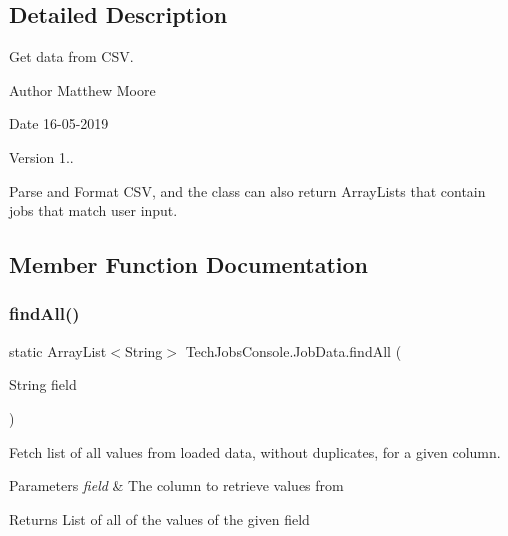 \subsection{Detailed Description}
Get data from C\+SV. 

\begin{DoxyAuthor}{Author}
Matthew Moore 
\end{DoxyAuthor}
\begin{DoxyDate}{Date}
16-\/05-\/2019 
\end{DoxyDate}
\begin{DoxyVersion}{Version}
1..
\end{DoxyVersion}
Parse and Format C\+SV, and the class can also return Array\+Lists that contain jobs that match user input. 

\subsection{Member Function Documentation}
\mbox{\label{class_tech_jobs_console_1_1_job_data_ac601200d9c2e103a30eee0b0eef6961a}} 
\subsubsection{\texorpdfstring{findAll()}{findAll()}\hspace{0.1cm}{\footnotesize\ttfamily [1/2]}}
{\footnotesize\ttfamily static Array\+List$<$String$>$ Tech\+Jobs\+Console.\+Job\+Data.\+find\+All (\begin{DoxyParamCaption}\item[{String}]{field }\end{DoxyParamCaption})\hspace{0.3cm}{\ttfamily [static]}}

Fetch list of all values from loaded data, without duplicates, for a given column.


\begin{DoxyParams}{Parameters}
{\em field} & The column to retrieve values from \\
\hline
\end{DoxyParams}
\begin{DoxyReturn}{Returns}
List of all of the values of the given field 
\end{DoxyReturn}
\mbox{\label{class_tech_jobs_console_1_1_job_data_a56ed5e82191b2a08930ad13c64c6849c}} 
